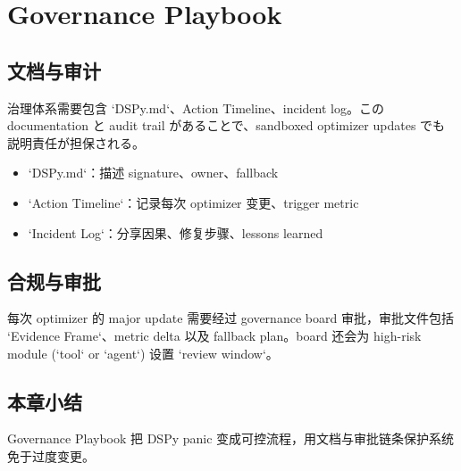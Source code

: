 \section{Governance Playbook}

\subsection{文档与审计}

治理体系需要包含 `DSPy.md`、Action Timeline、incident log。この documentation と audit trail があることで、sandboxed optimizer updates でも説明責任が担保される。

\begin{itemize}
    \item `DSPy.md`：描述 signature、owner、fallback
    \item `Action Timeline`：记录每次 optimizer 变更、trigger metric
    \item `Incident Log`：分享因果、修复步骤、lessons learned
\end{itemize}

\subsection{合规与审批}

每次 optimizer 的 major update 需要经过 governance board 审批，审批文件包括 `Evidence Frame`、metric delta 以及 fallback plan。board 还会为 high-risk module (`tool` or `agent`) 设置 `review window`。

\subsection{本章小结}

Governance Playbook 把 DSPy panic 变成可控流程，用文档与审批链条保护系统免于过度变更。

